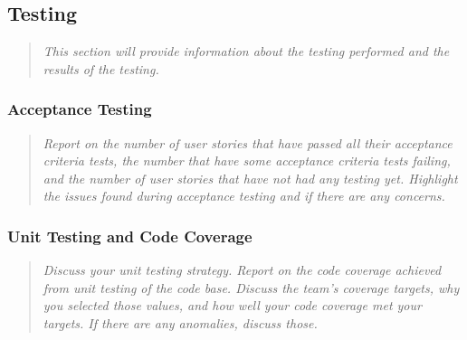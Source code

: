 \hypertarget{testing}{%
\subsection{Testing}\label{testing}}

\begin{quote}
\emph{This section will provide information about the testing performed
and the results of the testing.}
\end{quote}

\hypertarget{acceptance-testing}{%
\subsubsection{Acceptance Testing}\label{acceptance-testing}}

\begin{quote}
\emph{Report on the number of user stories that have passed all their
acceptance criteria tests, the number that have some acceptance criteria
tests failing, and the number of user stories that have not had any
testing yet. Highlight the issues found during acceptance testing and if
there are any concerns.}
\end{quote}

\hypertarget{unit-testing-and-code-coverage}{%
\subsubsection{Unit Testing and Code
Coverage}\label{unit-testing-and-code-coverage}}

\begin{quote}
\emph{Discuss your unit testing strategy. Report on the code coverage
achieved from unit testing of the code base. Discuss the team's coverage
targets, why you selected those values, and how well your code coverage
met your targets. If there are any anomalies, discuss those.}
\end{quote}
